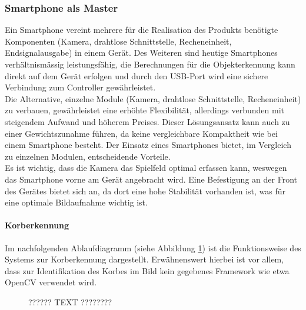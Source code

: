 \subsubsection{Smartphone als Master}
	Ein Smartphone vereint mehrere für die Realisation des Produkts benötigte Komponenten (Kamera, drahtlose Schnittstelle, Recheneinheit, Endsignalausgabe) 
	in einem Gerät. Des Weiteren sind heutige Smartphones verhältnismässig leistungsfähig, die Berechnungen für die Objekterkennung 
	kann direkt auf dem Gerät erfolgen und durch den USB-Port wird eine sichere Verbindung zum Controller gewährleistet.\\
	Die Alternative, einzelne Module (Kamera, drahtlose Schnittstelle, Recheneinheit) zu verbauen, 
	gewährleistet eine erhöhte Flexibilität, allerdings verbunden mit steigendem Aufwand und höherem Preises. 
	Dieser Lösungsansatz kann auch zu einer Gewichtszunahme führen, da keine vergleichbare Kompaktheit wie bei einem Smartphone besteht. 
	Der Einsatz eines Smartphones bietet, im Vergleich zu einzelnen Modulen, entscheidende Vorteile.\\
	Es ist wichtig, dass die Kamera das Spielfeld optimal erfassen kann, weswegen das Smartphone vorne am Gerät angebracht wird. 
	Eine Befestigung an der Front des Gerätes bietet sich an, da dort eine hohe Stabilität vorhanden ist, 
	was für eine optimale Bildaufnahme wichtig ist.\\
	
	\paragraph{Korberkennung\\}
	Im nachfolgenden Ablaufdiagramm (siehe Abbildung \ref{fig:Ablaufdiagramm}) ist die Funktionsweise des Systems zur Korberkennung dargestellt. 
	Erwähnenswert hierbei ist vor allem, dass zur Identifikation des Korbes im Bild kein gegebenes Framework wie etwa OpenCV verwendet wird. \\
	
	\begin{figure}[h!]
		\centering
		\caption{?????? TEXT ????????}
		\label{fig:Ablaufdiagramm}
	\end{figure}
	
